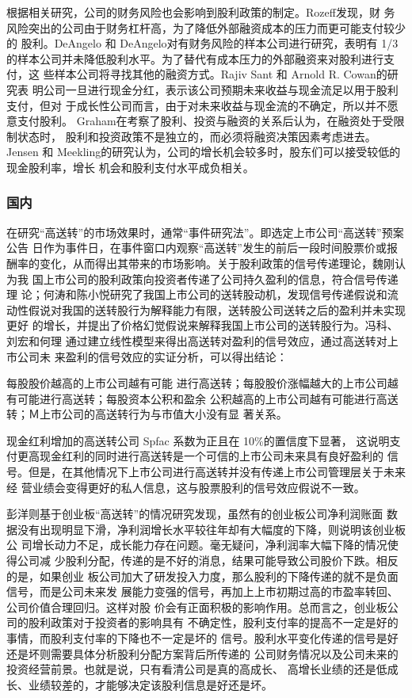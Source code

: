 \documentclass[../main]{subfiles}
\begin{document}
根据相关研究，公司的财务风险也会影响到股利政策的制定。Rozeff发现，财
务风险突出的公司由于财务杠杆高，为了降低外部融资成本的压力而更可能支付较少的
股利。DeAngelo 和 DeAngelo对有财务风险的样本公司进行研究，表明有 1/3
的样本公司并未降低股利水平。为了替代有成本压力的外部融资来对股利进行支付，这
些样本公司将寻找其他的融资方式。Rajiv Sant 和 Arnold R. Cowan的研究表
明公司一旦进行现金分红，表示该公司预期未来收益与现金流足以用于股利支付，但对
于成长性公司而言，由于对未来收益与现金流的不确定，所以并不愿意支付股利。
Graham在考察了股利、投资与融资的关系后认为，在融资处于受限制状态时，
股利和投资政策不是独立的，而必须将融资决策因素考虑进去。 Jensen 和
Meekling的研究认为，公司的增长机会较多时，股东们可以接受较低的现金股利率，增长
机会和股利支付水平成负相关。

\subsubsection{国内}%
\label{ssub:national}

在研究“高送转”的市场效果时，通常“事件研究法”。即选定上市公司“高送转”预案公告
日作为事件日，在事件窗口内观察“高送转”发生的前后一段时间股票价或报
酬率的变化，从而得出其带来的市场影响。关于股利政策的信号传递理论，魏刚认为我
国上市公司的股利政策向投资者传递了公司持久盈利的信息，符合信号传递理
论；何涛和陈小悦研究了我国上市公司的送转股动机，发现信号传递假说和流
动性假说对我国的送转股行为解释能力有限，送转股公司送转之后的盈利并未实现更好
的增长，并提出了价格幻觉假说来解释我国上市公司的送转股行为。冯科、刘宏和何理
通过建立线性模型来得出高送转对盈利的信号效应，通过高送转对上市公司未
来盈利的信号效应的实证分析，可以得出结论：

每股股价越高的上市公司越有可能
进行高送转；每股股价涨幅越大的上市公司越有可能进行高送转；每股资本公积和盈余
公积越高的上市公司越有可能进行高送转；Ｍ上市公司的高送转行为与市值大小没有显
著关系。

现金红利增加的高送转公司 Spfac 系数为正且在 10\%的置信度下显著，
这说明支付更高现金红利的同时进行高送转是一个可信的上市公司未来具有良好盈利的
信号。但是，在其他情况下上市公司进行高送转并没有传递上市公司管理层关于未来经
营业绩会变得更好的私人信息，这与股票股利的信号效应假说不一致。

彭洋则基于创业板“高送转”的情况研究发现，虽然有的创业板公司净利润账面
数据没有出现明显下滑，净利润增长水平较往年却有大幅度的下降，则说明该创业板公
司增长动力不足，成长能力存在问题。毫无疑问，净利润率大幅下降的情况使得公司减
少股利分配，传递的是不好的消息，结果可能导致公司股价下跌。相反的是，如果创业
板公司加大了研发投入力度，那么股利的下降传递的就不是负面信号，而是公司未来发
展能力变强的信号，再加上上市初期过高的市盈率转回、公司价值合理回归。这样对股
价会有正面积极的影响作用。总而言之，创业板公司的股利政策对于投资者的影响具有
不确定性，股利支付率的提高不一定是好的事情，而股利支付率的下降也不一定是坏的
信号。股利水平变化传递的信号是好还是坏则需要具体分析股利分配方案背后所传递的
公司财务情况以及公司未来的投资经营前景。也就是说，只有看清公司是真的高成长、
高增长业绩的还是低成长、业绩较差的，才能够决定该股利信息是好还是坏。
\end{document}
